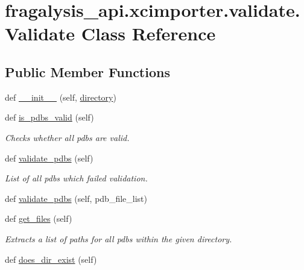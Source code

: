 \hypertarget{classfragalysis__api_1_1xcimporter_1_1validate_1_1_validate}{}\section{fragalysis\+\_\+api.\+xcimporter.\+validate.\+Validate Class Reference}
\label{classfragalysis__api_1_1xcimporter_1_1validate_1_1_validate}
\subsection*{Public Member Functions}
\begin{DoxyCompactItemize}
\item 
def \hyperlink{classfragalysis__api_1_1xcimporter_1_1validate_1_1_validate_a27319a45d204d3a917eb000a0e636e3e}{\+\_\+\+\_\+init\+\_\+\+\_\+} (self, \hyperlink{classfragalysis__api_1_1xcimporter_1_1validate_1_1_validate_a4ef4b2db6e032059c04e6dead4a8998f}{directory})
\item 
def \hyperlink{classfragalysis__api_1_1xcimporter_1_1validate_1_1_validate_a174b180dade39cdd984389ab32ed3732}{is\+\_\+pdbs\+\_\+valid} (self)
\begin{DoxyCompactList}\small\item\em Checks whether all pdbs are valid. \end{DoxyCompactList}\item 
def \hyperlink{classfragalysis__api_1_1xcimporter_1_1validate_1_1_validate_a1e2236300274a3e4c91944ff8a10f432}{validate\+\_\+pdbs} (self)
\begin{DoxyCompactList}\small\item\em List of all pdbs which failed validation. \end{DoxyCompactList}\item 
def \hyperlink{classfragalysis__api_1_1xcimporter_1_1validate_1_1_validate_a2efb516ce319ed46c758ffbf70056df1}{validate\+\_\+pdbs} (self, pdb\+\_\+file\+\_\+list)
\item 
def \hyperlink{classfragalysis__api_1_1xcimporter_1_1validate_1_1_validate_a0b6c43c8e26bc7b2bc5f2caf982f0a5e}{get\+\_\+files} (self)
\begin{DoxyCompactList}\small\item\em Extracts a list of paths for all pdbs within the given directory. \end{DoxyCompactList}\item 
def \hyperlink{classfragalysis__api_1_1xcimporter_1_1validate_1_1_validate_a885f473957a347300395920895108c64}{does\+\_\+dir\+\_\+exist} (self)

\end{DoxyCompactItemize}
